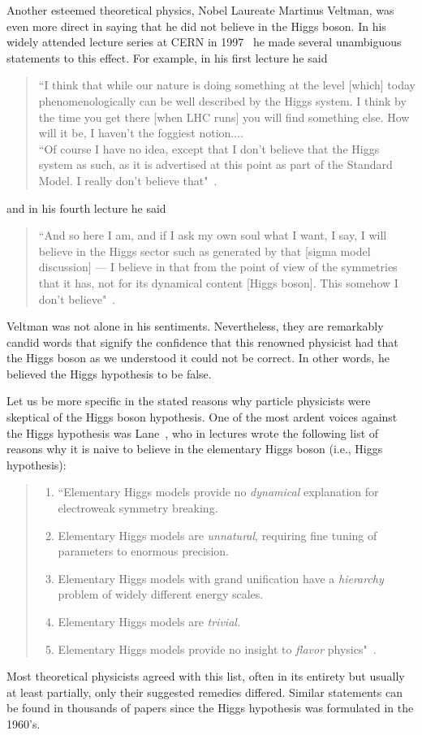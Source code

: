 \documentclass[letter,12pt]{article}
\begin{document}
Another esteemed theoretical physics, Nobel Laureate Martinus Veltman, was even more direct in saying that he did not believe in the Higgs boson. In his widely attended lecture series at CERN in 1997~\cite{Veltman:1997} he made several unambiguous statements to this effect. For example, in his first lecture he said
\begin{quote} %
``I think that while our nature is doing something at the level [which] today phenomenologically can be well described by the Higgs system. I think by the time you get there [when LHC runs] you will find something else. How will it be, I haven't the foggiest notion....\\

``Of course I have no idea, except that I don't believe that the Higgs system as such, as it is advertised at this point as part of the Standard Model. I really don't believe that"~\cite{Veltman:1997}.
\end{quote}
and in his fourth lecture he said
\begin{quote} %
``And so here I am, and if I ask my own soul what I want, I say, I will believe in the Higgs sector such as generated by that [sigma model discussion] --- I believe in that from the point of view of the symmetries that it has, not for its dynamical content [Higgs boson]. This somehow I don't believe"~\cite{Veltman:1997}.
\end{quote}
Veltman was not alone in his sentiments. Nevertheless, they are remarkably candid words that signify the confidence that this renowned physicist had that the Higgs boson as we understood it could not be correct.  In other words, he believed the Higgs hypothesis to be false.

Let us be more specific in the stated reasons why particle physicists were skeptical of the Higgs boson hypothesis. One of the most ardent voices against the Higgs hypothesis was Lane~\cite{Lane:2002wv}, who in lectures wrote the following list of reasons why it is naive to believe in the elementary Higgs boson (i.e., Higgs hypothesis):
\begin{quote}
\begin{enumerate}
\item ``Elementary Higgs models provide no {\it dynamical} explanation for electroweak symmetry breaking.
\item Elementary Higgs models are {\it unnatural}, requiring fine tuning of parameters
to enormous precision. 
\item Elementary Higgs models with grand unification have a {\it hierarchy} problem
of widely different energy scales.
\item Elementary Higgs models are {\it trivial.}
\item Elementary Higgs models provide no insight to {\it flavor} physics"~\cite{Lane:2002wv}. 
\end{enumerate}
\end{quote}
Most theoretical physicists agreed with this list, often in its entirety but usually at least partially, only their suggested remedies differed. Similar statements can be found in thousands of papers since the Higgs hypothesis was formulated in the 1960's. 
\end{document}
